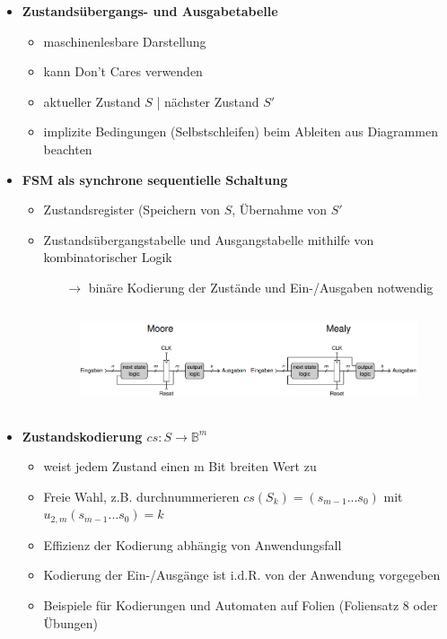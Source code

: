 \documentclass[11pt,a4paper]{article}
\begin{document}
\begin{itemize}
\begin{itemize}
\begin{itemize}
	\end{itemize}
	
\item \textbf{Zustandsübergangs- und Ausgabetabelle}
	\begin{itemize}
	\item maschinenlesbare Darstellung
	\item kann Don't Cares verwenden
	\item aktueller Zustand $S$ | nächster Zustand $S'$
	\item implizite Bedingungen (Selbstschleifen) beim Ableiten aus Diagrammen beachten
	\end{itemize}
	
\item \textbf{FSM als synchrone sequentielle Schaltung}
	\begin{itemize}
	\item Zustandsregister (Speichern von $S$, Übernahme von $S'$
	\item Zustandsübergangstabelle und Ausgangstabelle mithilfe von kombinatorischer Logik
		\begin{itemize}
		\item[$\rightarrow$] binäre Kodierung der Zustände und Ein-/Ausgaben notwendig
		\end{itemize}
		
	\item[] \begin{figure}[H]
				\begin{center}
				\includegraphics[height=3cm]{Bilder/fsmsequentiell}
				\end{center}
			\end{figure}
	\end{itemize}
	
\item \textbf{Zustandskodierung $cs: S \rightarrow \mathbb{B}^m$}
	\begin{itemize}
	\item weist jedem Zustand einen m Bit breiten Wert zu
	\item Freie Wahl, z.B. durchnummerieren $cs(S_k)=(s_{m-1}...s_0)$ mit $u_{2,m}(s_{m-1}...s_0)=k$
	\item Effizienz der Kodierung abhängig von Anwendungsfall
	\item Kodierung der Ein-/Ausgänge ist i.d.R. von der Anwendung vorgegeben
	\item Beispiele für Kodierungen und Automaten auf Folien (Foliensatz 8 oder Übungen)
	\end{itemize}



\end{itemize}
\end{itemize}
\end{document}
